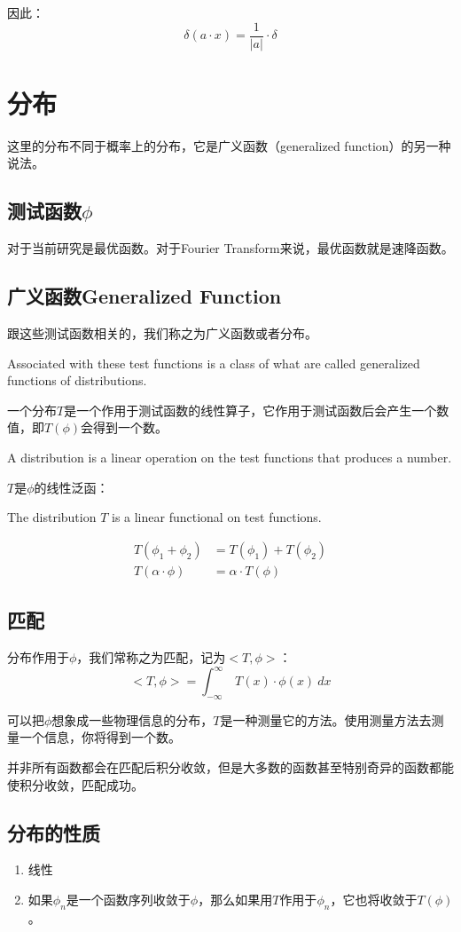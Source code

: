 因此：
\begin{equation}
	\delta(a\cdot x)=\frac{1}{|a|}\cdot \delta
\end{equation}
\section{分布}
这里的分布不同于概率上的分布，它是广义函数（generalized function）的另一种说法。
\subsection{测试函数$\phi$}
对于当前研究是最优函数。对于Fourier Transform来说，最优函数就是速降函数。
\subsection{广义函数Generalized Function}
跟这些测试函数相关的，我们称之为广义函数或者分布。

Associated with these test functions is a class of what are called generalized functions of distributions.

一个分布$T$是一个作用于测试函数的线性算子，它作用于测试函数后会产生一个数值，即$T(\phi)$会得到一个数。

A distribution is a linear operation on the test functions that produces a number.

$T$是$\phi$的线性泛函：

The distribution $T$ is a linear functional on test functions.

\begin{align*}
	T(\phi_1+\phi_2)    & =T(\phi_1)+T(\phi_2) \\
	T(\alpha\cdot \phi) & =\alpha\cdot T(\phi)
\end{align*}
\subsection{匹配}
分布作用于$\phi$，我们常称之为匹配，记为$<T,\phi>$：
\begin{equation}
	<T,\phi> = \int_{-\infty}^{\infty}\ T(x)\cdot \phi(x)\ dx
\end{equation}

可以把$\phi$想象成一些物理信息的分布，$T$是一种测量它的方法。使用测量方法去测量一个信息，你将得到一个数。

并非所有函数都会在匹配后积分收敛，但是大多数的函数甚至特别奇异的函数都能使积分收敛，匹配成功。

\subsection{分布的性质}
\begin{enumerate}
	\item 线性
	\item 如果$\phi_n$是一个函数序列收敛于$\phi$，那么如果用$T$作用于$\phi_n$，它也将收敛于$T(\phi)$。
\end{enumerate}



